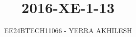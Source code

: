 \documentclass[journal]{IEEEtran}
\begin{document}

\vspace{3cm}

\title{2016-XE-1-13}
\author{EE24BTECH11066 - YERRA AKHILESH
}
{\let\newpage\relax\maketitle}

\renewcommand{\thefigure}{\theenumi}
\renewcommand{\thetable}{\theenumi}
\setlength{\intextsep}{10pt} %


\renewcommand{\thetable}{\theenumi}
\end{document}
